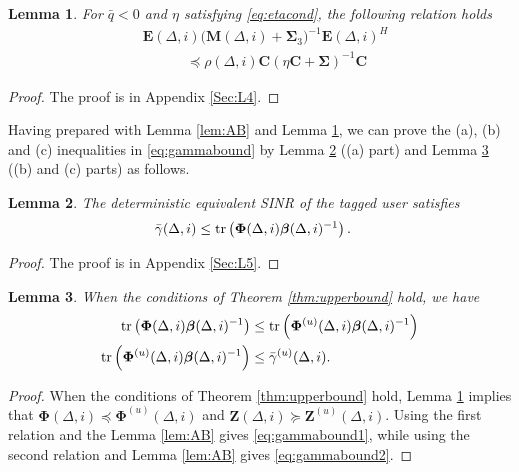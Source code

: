 \documentclass[conference, a4paper, 10pt]{IEEEtran}
\newtheorem{lem}{Lemma}
\newcommand{\mx}[1]{\mathbf{#1}}
\newcommand{\bs}[1]{\boldsymbol{#1}}
\begin{document}
\begin{lem}
\label{lem:beta}
For $\bar{q}<0$ and $\eta$ satisfying \eqref{eq:etacond},
the following relation holds
\begin{align}
&\mx{E}(\Delta, i) \big(\mx{M}(\Delta,i)+\mx{\Sigma}_3\big)^{-1} \mx{E}(\Delta, i)^H
\nonumber \\&
~~~~~~~~~~~~~~\preceq \rho(\Delta, i) \mx{C} \left( \eta \mx{C} \!+\! \bs{\Sigma} \right)^{-1} \mx{C}
\label{eq:mrel}
\end{align}
\end{lem}
\begin{proof}
The proof is in Appendix \ref{Sec:L4}.
\end{proof}

Having prepared with Lemma \ref{lem:AB} and Lemma \ref{lem:beta}, we can prove the (a), (b) and (c) inequalities in \eqref{eq:gammabound} by Lemma \ref{lem:det} ((a) part) and Lemma \ref{lem:ineq} ((b) and (c) parts) as follows.
\begin{lem}
\label{lem:det}
The deterministic equivalent \ac{SINR} of the tagged user satisfies
\begin{align}
& \bar{\gamma}(\Delta, i) \leq   \textup{tr}\left( \bs{\Phi}(\Delta, i) \bs{\beta}(\Delta, i)^{-1} \right).
\nonumber
\end{align}
\end{lem}
\begin{proof}
The proof is in Appendix \ref{Sec:L5}.
\end{proof}

\begin{lem}
\label{lem:ineq}
When the conditions of Theorem \ref{thm:upperbound} hold, we have
\begin{align}
 \textup{tr}\left( \bs{\Phi}(\Delta, i) \bs{\beta}(\Delta, i)^{-1} \right) &\leq
\textup{tr}\left( \bs{\Phi}^{(u)}(\Delta, i) \bs{\beta}(\Delta, i)^{-1} \right)
\label{eq:gammabound1}
\\
  \textup{tr}\left( \bs{\Phi}^{(u)}(\Delta, i) \bs{\beta}(\Delta, i)^{-1} \right)
&\leq \bar{\gamma}^{(u)}(\Delta, i).
\label{eq:gammabound2}
\end{align}
\end{lem}

\begin{proof}
When the conditions of Theorem \ref{thm:upperbound} hold,
Lemma \ref{lem:beta} implies that
 $\bs{\Phi}(\Delta, i)\preceq \bs{\Phi}^{(u)}(\Delta, i)$
 and
$\mx{Z}(\Delta, i) \succeq \mx{Z}^{(u)}(\Delta, i)$.
Using the first relation and %
the Lemma \ref{lem:AB}
gives \eqref{eq:gammabound1},
while using the second relation and Lemma \ref{lem:AB} gives \eqref{eq:gammabound2}.
\end{proof}
\end{document}

